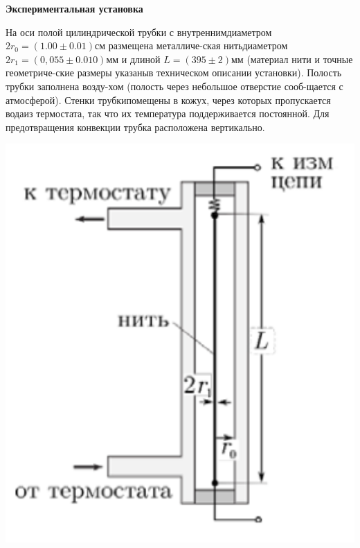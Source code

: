 \begin{center}
	\large{\textbf{Экспериментальная установка}}
\end{center}

\begin{minipage}{.6\textwidth}

	На оси полой цилиндрической трубки с внутреннимдиаметром $2r_0=(1.00\pm0.01)см$ размещена металличе-ская   нитьдиаметром $2r_1=(0,055\pm0.010)мм$ и длиной $L=(395\pm2)мм$ (материал нити и точные геометриче-ские размеры указаныв техническом описании установки). Полость трубки заполнена возду-хом (полость через небольшое отверстие сооб-щается с атмосферой). Стенки трубкипомещены в кожух, через которых пропускается водаиз термостата, так что их температура поддерживается постоянной. Для предотвращения конвекции трубка  расположена вертикально.

\end{minipage}%
\begin{minipage}{.4\textwidth}
	\includegraphics[width=1\textwidth]{scheme.png}
\end{minipage}


